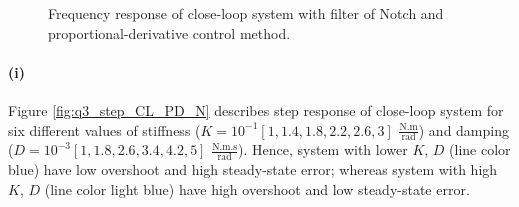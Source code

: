\begin{figure}[h!]
	\centering
	\hfill
	\caption{Frequency response of close-loop system with filter of Notch and proportional-derivative control method.}
	\label{fig:q3_CL_N_PD_bode}
\end{figure}

\newpage
\paragraph{(i)} Figure \ref{fig:q3_step_CL_PD_N} describes step response of close-loop system for six different values of stiffness  ($K=10^{-1}[1, 1.4, 1.8, 2.2, 2.6, 3]$ $\mathrm{\frac{N.m}{rad}}$) and damping ($D=10^{-3}[1, 1.8, 2.6, 3.4, 4.2, 5]$ $\mathrm{\frac{N.m.s}{rad}}$).  Hence, system with lower $K$, $D$ (line color blue) have low overshoot and high steady-state error; whereas system with high $K$, $D$ (line color light blue) have high overshoot and low steady-state error.


